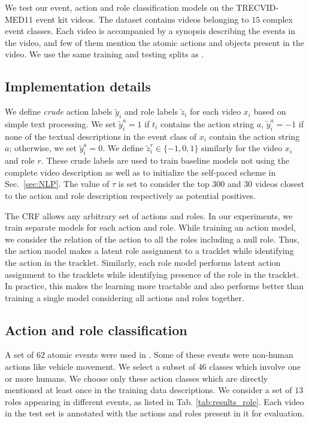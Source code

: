 \documentclass[10pt,twocolumn,letterpaper]{article}
\begin{document}
We test our event, action and role classification models on the TRECVID-MED11 event kit videos. The dataset contains videos belonging to $15$ complex event classes. Each video is accompanied by a synopsis describing the events in the video, and few of them mention the atomic actions and objects present in the video. We use the same training and testing splits as \cite{Izadinia_ECCV12}. 

\subsection{Implementation details}\label{sec:implementation_details}
We define \textit{crude} action labels $\tilde{y}_i$ and role labels
$\tilde{z}_i$ for each video $x_i$ based on simple text processing. We set
$\tilde{y}_i^a = 1$ if $t_i$ contains the action string $a$, $\tilde{y}_i^a =
-1$ if none of the textual descriptions in the event class of $x_i$ contain
the action string $a$; otherwise, we set $\tilde{y}_i^a=0$. We define
$\tilde{z}_i^r \in \{-1,0,1\}$ similarly for the video $x_i$ and role $r$.
These crude labels are used to train baseline models not using the
complete video description as well as to initialize the self-paced scheme in
Sec.~\ref{sec:NLP}. The value of $\tau$ is set to consider the top $300$ and
$30$ videos closest to the action and role description respectively as
potential positives.

The CRF allows any arbitrary set of actions and roles. In our experiments, we train separate models for each action and role. While training an action model, we consider the relation of the action to all the roles including a null role. Thus, the action model makes a latent role assignment to a tracklet while identifying the action in the tracklet. Similarly, each role model performs latent action assignment to the tracklets while identifying presence of the role in the tracklet. In practice, this makes the learning more tractable and also performs better than training a single model considering all actions and roles together.

\subsection{Action and role classification} \label{sec:results_actionRoles}
A set of $62$ atomic events were used in \cite{Izadinia_ECCV12}. Some of these events were non-human actions like vehicle movement. We select a subset of $46$ classes which involve one or more humans. We choose only these action classes which are directly mentioned at least once in the training data descriptions. We consider a set of $13$ roles appearing in different events, as listed in Tab. \ref{tab:results_role}. Each video in the test set is annotated with the actions and roles present in it for evaluation. 
  
\end{document}
